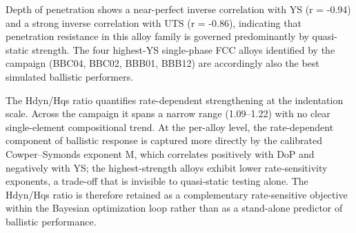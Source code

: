 \documentclass[final,5p,times,twocolumn]{elsarticle}
\begin{document}
Depth of penetration shows a near-perfect inverse correlation with YS (r = -0.94) and a strong inverse correlation with UTS (r = -0.86), indicating that penetration resistance in this alloy family is governed predominantly by quasi-static strength. The four highest-YS single-phase FCC alloys identified by the campaign (BBC04, BBC02, BBB01, BBB12) are accordingly also the best simulated ballistic performers.

The Hdyn/Hqs ratio quantifies rate-dependent strengthening at the indentation scale. Across the campaign it spans a narrow range (1.09–1.22) with no clear single-element compositional trend. At the per-alloy level, the rate-dependent component of ballistic response is captured more directly by the calibrated Cowper–Symonds exponent M, which correlates positively with DoP and negatively with YS; the highest-strength alloys exhibit lower rate-sensitivity exponents, a trade-off that is invisible to quasi-static testing alone. The Hdyn/Hqs ratio is therefore retained as a complementary rate-sensitive objective within the Bayesian optimization loop rather than as a stand-alone predictor of ballistic performance.






\clearpage
{}

\end{document}
